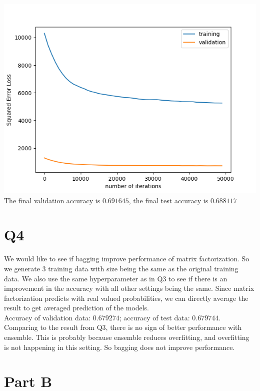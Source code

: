 \documentclass[12pt]{article}
\begin{document}
	\includegraphics[scale=0.5]{a35}\\
	The final validation accuracy is $0.691645$, the final test accuracy is $0.688117$
	\newpage
	\section*{Q4}
	We would like to see if bagging improve performance of matrix factorization. So we generate 3 training data with size being the same as the original training data. We also use the same hyperparameter as in Q3 to see if there is an improvement in the accuracy with all other settings being the same. Since matrix factorization predicts with real valued probabilities, we can directly average the result to get averaged prediction of the models.\\
	Accuracy of validation data: $0.679274$; accuracy of test data: $0.679744$. Comparing to the result from Q3, there is no sign of better performance with ensemble. This is probably because ensemble reduces overfitting, and overfitting is not happening in this setting. So bagging does not improve performance.
	
	\newpage
	\section*{Part B}
\end{document}
